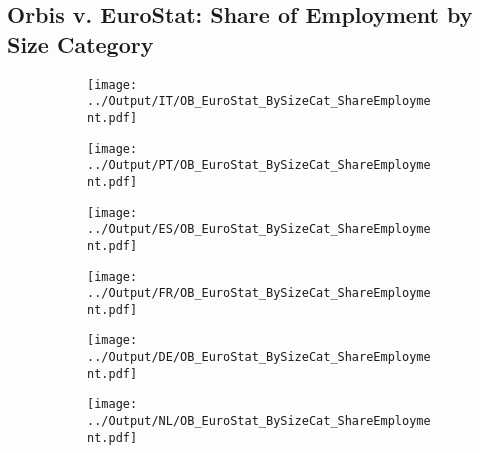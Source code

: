 \documentclass[12pt,notitlepage]{article}
\begin{document}
\subsection{Orbis v. EuroStat: Share of Employment by Size Category}
\begin{figure}[!htpb]
\centering
\begin{subfigure}{.49\textwidth}
    \centering
 \texttt{[image: ../Output/IT/OB\_EuroStat\_BySizeCat\_ShareEmployment.pdf]}
\end{subfigure}%
\begin{subfigure}{.49\textwidth}
    \centering
 \texttt{[image: ../Output/PT/OB\_EuroStat\_BySizeCat\_ShareEmployment.pdf]}
\end{subfigure}
\begin{subfigure}{.49\textwidth}
    \centering
 \texttt{[image: ../Output/ES/OB\_EuroStat\_BySizeCat\_ShareEmployment.pdf]}
\end{subfigure}%
\begin{subfigure}{.49\textwidth}
    \centering
 \texttt{[image: ../Output/FR/OB\_EuroStat\_BySizeCat\_ShareEmployment.pdf]}
\end{subfigure}
\begin{subfigure}{.49\textwidth}
    \centering
 \texttt{[image: ../Output/DE/OB\_EuroStat\_BySizeCat\_ShareEmployment.pdf]}
\end{subfigure}
\begin{subfigure}{.49\textwidth}
    \centering
 \texttt{[image: ../Output/NL/OB\_EuroStat\_BySizeCat\_ShareEmployment.pdf]}
\end{subfigure}
\end{figure}
\clearpage
\end{document}
